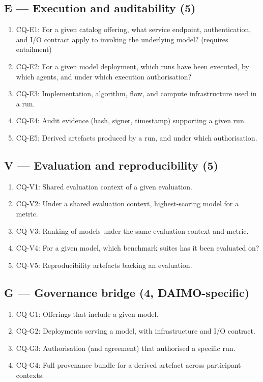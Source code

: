 \documentclass[11pt,a4paper]{article}
\newcommand{\cq}[1]{\textsf{#1}}
\begin{document}
\subsection*{E --- Execution and auditability (5)}
\begin{enumerate}[label=\arabic*., leftmargin=*]
\item \cq{CQ-E1}: For a given catalog offering, what service endpoint, authentication, and I/O contract apply to invoking the underlying model? (requires entailment)
\item \cq{CQ-E2}: For a given model deployment, which runs have been executed, by which agents, and under which execution authorisation?
\item \cq{CQ-E3}: Implementation, algorithm, flow, and compute infrastructure used in a run.
\item \cq{CQ-E4}: Audit evidence (hash, signer, timestamp) supporting a given run.
\item \cq{CQ-E5}: Derived artefacts produced by a run, and under which authorisation.
\end{enumerate}

\subsection*{V --- Evaluation and reproducibility (5)}
\begin{enumerate}[label=\arabic*., leftmargin=*]
\item \cq{CQ-V1}: Shared evaluation context of a given evaluation.
\item \cq{CQ-V2}: Under a shared evaluation context, highest-scoring model for a metric.
\item \cq{CQ-V3}: Ranking of models under the same evaluation context and metric.
\item \cq{CQ-V4}: For a given model, which benchmark suites has it been evaluated on?
\item \cq{CQ-V5}: Reproducibility artefacts backing an evaluation.
\end{enumerate}

\subsection*{G --- Governance bridge (4, DAIMO-specific)}
\begin{enumerate}[label=\arabic*., leftmargin=*]
\item \cq{CQ-G1}: Offerings that include a given model.
\item \cq{CQ-G2}: Deployments serving a model, with infrastructure and I/O contract.
\item \cq{CQ-G3}: Authorisation (and agreement) that authorised a specific run.
\item \cq{CQ-G4}: Full provenance bundle for a derived artefact across participant contexts.
\end{enumerate}
\end{document}
